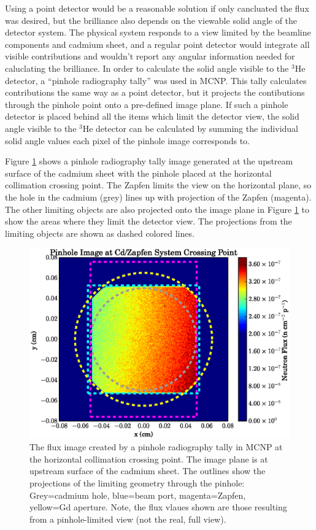 \documentclass[5p,12pt]{elsarticle}
\begin{document}
Using a point detector would be a reasonable solution if only cancluated the flux was desired, but the brilliance also depends on the viewable solid angle of the detector system.   The physical system responds to a view limited by the beamline components and cadmium sheet, and a regular point detector would integrate all visible contributions and wouldn't report any angular information needed for caluclating the brilliance.  In order to calculate the solid angle visible to the $^3$He detector, a ``pinhole radiography tally'' was used in MCNP.  This tally calculates contributions the same way as a point detector, but it projects the contibutions through the pinhole point onto a pre-defined image plane.  If such a pinhole detector is placed behind all the items which limit the detector view, the solid angle visible to the $^3$He detector can be calculated by summing the individual solid angle values each pixel of the pinhole image corresponds to.

Figure \ref{fig:pinhole_image} shows a pinhole radiography tally image generated at the upstream surface of the cadmium sheet with the pinhole placed at the horizontal collimation crossing point.  The Zapfen limits the view on the horizontal plane, so the hole in the cadmium (grey) lines up with projection of the Zapfen (magenta).  The other limiting objects are also projected onto the image plane in Figure \ref{fig:pinhole_image} to show the areas where they limit the detector view. The projections from the limiting objects are shown as dashed colored lines.   

\begin{figure}[h!] 
  \centering
    \includegraphics[width=\columnwidth]{graphics/pinhole.eps}
     \caption{The flux image created by a pinhole radiography tally in MCNP at the horizontal collimation crossing point.  The image plane is at upstream surface of the cadmium sheet.  The outlines show the projections of the limiting geometry through the pinhole: Grey=cadmium hole, blue=beam port, magenta=Zapfen, yellow=Gd aperture.  Note, the flux vlaues shown are those resulting from a pinhole-limited view (not the real, full view).  \label{fig:pinhole_image}}
\end{figure}
\end{document}
